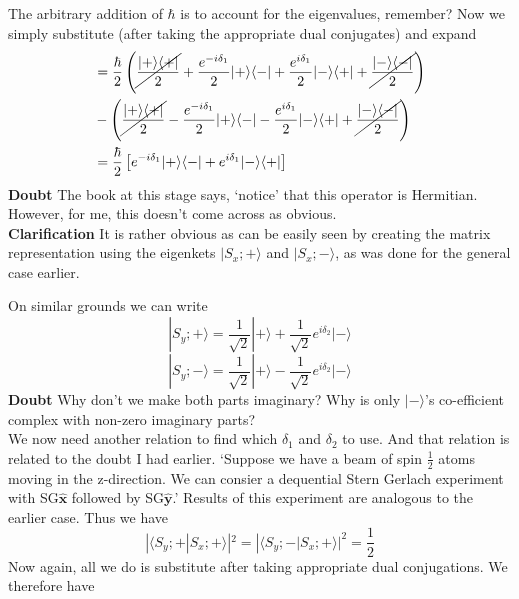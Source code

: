 \documentclass[12pt]{article}
\def\*#1{\boldsymbol{#1}}
\let\oldhat\hat
\renewcommand{\hat}[1]{\oldhat{\*{#1}}}
\def\ket#1{|#1 \rangle}
\def\inpr#1#2{\langle #1|#2 \rangle}
\def\oupr#1#2{| #1 \rangle \langle #2 |}
\begin{document}
				The arbitrary addition of $\hbar$ is to account for the eigenvalues, remember? Now we simply substitute (after taking the appropriate dual conjugates) and expand
				\begin{align}
					&=\frac \hbar 2 \left({\cancel{\frac{\oupr ++}2}} + \frac {e^{-i\delta_1}} 2 \oupr + - + \frac {e^{i\delta_1}} 2 \oupr - + + {\cancel{\frac{\oupr --} 2}} \right) \\
					&- \left({\cancel{\frac{\oupr ++}2}} - \frac {e^{-i\delta_1}} 2 \oupr + - - \frac {e^{i\delta_1}} 2 \oupr - + + {\cancel{\frac{\oupr --} 2}} \right) \\
					&=\frac \hbar 2 \left[e^{-i\delta_1} \oupr + - + e^{i\delta_1}\oupr - + \right]
				\end{align}
				{\bf Doubt} The book at this stage says, `notice' that this operator is Hermitian. However, for me, this doesn't come across as obvious.\\
				{\bf Clarification} It is rather obvious as can be easily seen by creating the matrix representation using the eigenkets $\ket {S_x; +}$ and $\ket {S_x; -}$, as was done for the general case earlier.
				\par
				On similar grounds we can write
				\begin{equation}
					\ket {S_y; +} = \frac 1 {\sqrt 2} \ket + + \frac 1 {\sqrt 2} e^{i\delta_2} \ket {-}
				\end{equation}
				\begin{equation}
					\ket {S_y;-} = \frac 1 {\sqrt 2} \ket + - \frac 1 {\sqrt 2} e^{i\delta_2} \ket {-}
				\end{equation}
				{\bf Doubt} Why don't we make both parts imaginary? Why is only $\ket -$'s co-efficient complex with non-zero imaginary parts?\\
				We now need another relation to find which $\delta_1$ and $\delta_2$ to use. And that relation is related to the doubt I had earlier. `Suppose we have a beam of spin $\frac 1 2$ atoms moving in the z-direction. We can consier a dequential Stern Gerlach experiment with SG$\hat x$ followed by SG$\hat y$.' Results of this experiment are analogous to the earlier case. Thus we have
				\begin{equation}
					|\inpr{S_y;+}{S_x;+}|^2 = |\inpr{S_y;-}{S_x;+}|^2 = \frac 1 2
				\end{equation}
				Now again, all we do is substitute after taking appropriate dual conjugations. We therefore have
\end{document}
